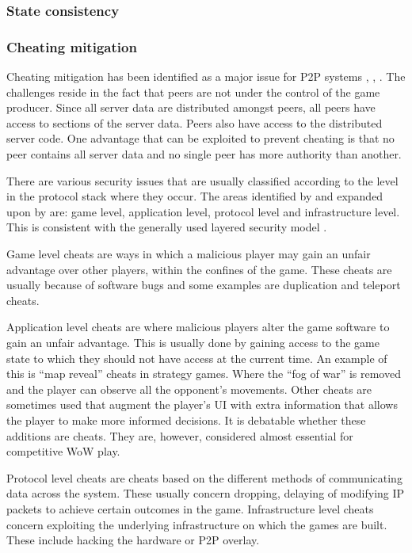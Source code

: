 \subsubsection{State consistency}

\subsubsection{Cheating mitigation}
\label{key_challenges_cheating}

Cheating mitigation has been identified as a major issue for P2P systems \cite{knutsson_p2p_first}, \cite{challenges_p2p_gaming},
\cite{cheat_proof_event_ordering}. The challenges reside in the fact that peers are not under the control of the game producer. Since all server data
are distributed amongst peers, all peers have access to sections of the server data. Peers also have access to the distributed server code. One
advantage that can be exploited to prevent cheating is that no peer contains all server data and no single peer has more authority than another.

There are various security issues that are usually classified according to the level in the protocol stack where they occur. The areas identified by
\cite{cheat_proof_event_ordering} and expanded upon by \cite{cheating_taxonomy} are: game level, application level, protocol level and infrastructure level. This is consistent with the generally used layered security model \cite{distributed_systems_security}.

Game level cheats are ways in which a malicious player may gain an unfair advantage over other players, within the confines of the game. These cheats are usually because of software bugs and some examples are duplication and teleport cheats.

Application level cheats are where malicious players alter the game software to gain an unfair advantage. This is usually done by gaining access to
the game state to which they should not have access at the current time. An example of this is ``map reveal'' cheats in strategy games. Where the
``fog of war'' is removed and the player can observe all the opponent's movements. Other cheats are sometimes used that augment the player's UI with extra information that allows the player to make more informed decisions. It is debatable whether these additions are cheats. They are, however, considered almost essential for competitive WoW play.

Protocol level cheats are cheats based on the different methods of communicating data across the system. These usually concern dropping, delaying of modifying IP packets to achieve certain outcomes in the game. Infrastructure level cheats concern exploiting the underlying infrastructure on which the games are built. These include hacking the hardware or P2P overlay.


